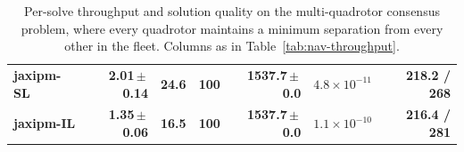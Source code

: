 \begin{table}[t]
{\begin{tabular}{@{}l r r r r r r@{}}
\textbf{jaxipm-SL} & \textbf{2.01\,$\pm$\,0.14} & \textbf{24.6} & \textbf{100} & \textbf{1537.7\,$\pm$\,0.0} & {\boldmath$4.8\!\times\!10^{-11}$} & \textbf{218.2 / 268} \\
\textbf{jaxipm-IL} & \textbf{1.35\,$\pm$\,0.06} & \textbf{16.5} & \textbf{100} & \textbf{1537.7\,$\pm$\,0.0} & {\boldmath$1.1\!\times\!10^{-10}$} & \textbf{216.4 / 281} \\
\bottomrule
\end{tabular}}
\caption{Per-solve throughput and solution quality on the multi-quadrotor consensus problem, where every quadrotor maintains a minimum separation from every other in the fleet. Columns as in Table~\ref{tab:nav-throughput}.}
\label{tab:multi-swap-throughput}
\end{table}
